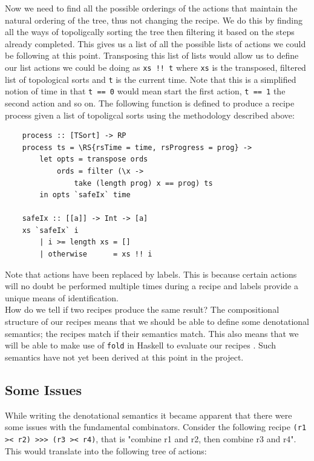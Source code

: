 \documentclass[11pt]{article}
\begin{document}
    Now we need to find all the possible orderings of the actions that maintain the natural
    ordering of the tree, thus not changing the recipe. We do this by finding all the
    ways of topoligcally sorting the tree then filtering it based on the steps already
    completed. This gives us a list of all the possible lists of actions we could be
    following at this point. Transposing this list of lists would allow us to
    define our list actions we could be doing as \texttt{xs !! t} where \texttt{xs}
    is the transposed, filtered list of topological sorts and \texttt{t} is the current
    time. Note that this is a simplified notion of time in that \texttt{t == 0} would
    mean start the first action, \texttt{t == 1} the second action and so on.
    The following function is defined to produce a recipe process given a list of topoligcal
    sorts using the methodology described above:
    \begin{tt}
    \small
    \begin{lstlisting}
    process :: [TSort] -> RP
    process ts = \RS{rsTime = time, rsProgress = prog} ->
        let opts = transpose ords
            ords = filter (\x ->
                take (length prog) x == prog) ts
        in opts `safeIx` time
    
    safeIx :: [[a]] -> Int -> [a]
    xs `safeIx` i
        | i >= length xs = []
        | otherwise      = xs !! i
    \end{lstlisting}
    \end{tt}
    
    Note that actions have been replaced by labels. This is because certain actions
    will no doubt be performed multiple times during a recipe and labels provide
    a unique means of identification. \\

    How do we tell if two recipes produce the same result? The compositional structure of our recipes
    means that we should be able to define some denotational semantics; the recipes match
    if their semantics match. This also means that we will be able to make use of \texttt{fold}
    in Haskell to evaluate our recipes \cite{hutton-fold}. Such semantics have not yet
    been derived at this point in the project.

    \subsection{Some Issues}

    While writing the denotational semantics it became apparent that there were
    some issues with the fundamental combinators. Consider the following recipe
    \texttt{(r1 >< r2) >>> (r3 >< r4)}, that is "combine r1 and r2, then combine
    r3 and r4". This would translate into the following tree of actions:
    
\end{document}
